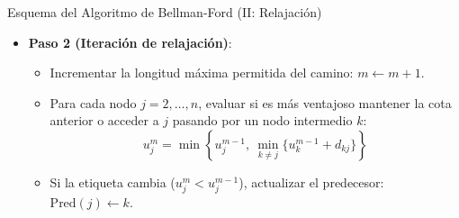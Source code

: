 \documentclass[
  ignorenonframetext,
]{beamer}
\providecommand{\tightlist}{%
  \setlength{\itemsep}{0pt}\setlength{\parskip}{0pt}}
\begin{document}
\begin{frame}{Esquema del Algoritmo de Bellman-Ford (II: Relajación)}
\label{esquema-del-algoritmo-de-bellman-ford-ii-relajaciuxf3n}
\begin{tcolorbox}[enhanced jigsaw, colframe=quarto-callout-note-color-frame, toptitle=1mm, colback=white, colbacktitle=quarto-callout-note-color!10!white, titlerule=0mm, breakable, coltitle=black, opacityback=0, bottomrule=.15mm, title=\textcolor{quarto-callout-note-color}{\faInfo}\hspace{0.5em}{Algoritmo de Bellman-Ford --- Paso 2: Relajación de arcos}, rightrule=.15mm, arc=.35mm, leftrule=.75mm, left=2mm, toprule=.15mm, bottomtitle=1mm, opacitybacktitle=0.6]

\begin{itemize}
\tightlist
\item
  \textbf{Paso 2 (Iteración de relajación)}:

  \begin{itemize}
  \tightlist
  \item
    Incrementar la longitud máxima permitida del camino:
    \(m \leftarrow m + 1\).
  \item
    Para cada nodo \(j = 2, \dots, n\), evaluar si es más ventajoso
    mantener la cota anterior o acceder a \(j\) pasando por un nodo
    intermedio \(k\): \[
    u_j^m = \min \left\{ u_j^{m-1}, \ \min_{k \neq j} \{ u_k^{m-1} + d_{kj} \} \right\}
    \]
  \item
    Si la etiqueta cambia (\(u_j^m < u_j^{m-1}\)), actualizar el
    predecesor: \(\text{Pred}(j) \leftarrow k\).
  \end{itemize}
\end{itemize}

\end{tcolorbox}
\end{frame}
\end{document}
